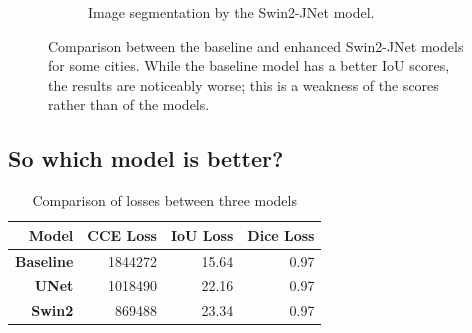 \begin{figure}[h]
\begin{subfigure}{.5\textwidth}
		\caption{Image segmentation by the Swin2-JNet model.}
	\end{subfigure}
	\caption{Comparison between the baseline and enhanced Swin2-JNet models for some cities. While the baseline model has a better IoU scores, the results are noticeably worse; this is a weakness of the scores rather than of the models.}
	\label{baseline_vs_swin2}
\end{figure}

\subsection{So which model is better?}

\begin{table}[h]
	\centering
	\begin{tabular}{>{\bfseries}r | r r r}
		\toprule
		Model & CCE Loss & IoU Loss & Dice Loss \\
		\midrule
		Baseline & \num{1844272} & 15.64 & 0.97 \\
		UNet & \num{1018490} & 22.16 & 0.97 \\
		Swin2 & \num{869488} & 23.34 & 0.97 \\
		\bottomrule
	\end{tabular}
	\caption{Comparison of losses between three models}
\end{table}
